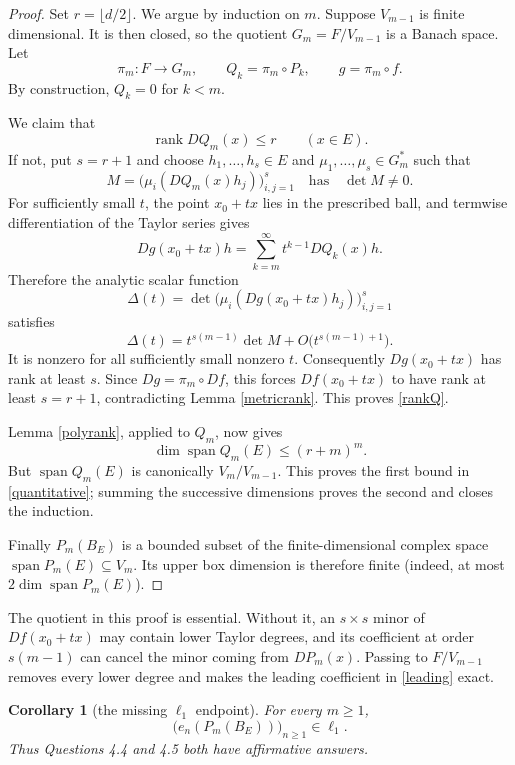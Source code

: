 \documentclass[11pt]{article}
\newtheorem{corollary}[theorem]{Corollary}
\newcommand{\Span}{\operatorname{span}}
\newcommand{\rank}{\operatorname{rank}}
\begin{document}
\begin{proof}
Set $r=\lfloor d/2\rfloor$.  We argue by induction on $m$.  Suppose
$V_{m-1}$ is finite dimensional.  It is then closed, so the quotient
$G_m=F/V_{m-1}$ is a Banach space.  Let
\[
 \pi_m:F\to G_m,
 \qquad Q_k=\pi_m\circ P_k,
 \qquad g=\pi_m\circ f.
\]
By construction, $Q_k=0$ for $k<m$.

We claim that
\begin{equation}\label{rankQ}
 \rank DQ_m(x)\le r\qquad(x\in E).
\end{equation}
If not, put $s=r+1$ and choose $h_1,\ldots,h_s\in E$ and
$\mu_1,\ldots,\mu_s\in G_m^*$ such that
\[
 M=\bigl(\mu_i(DQ_m(x)h_j)\bigr)_{i,j=1}^s
 \quad\text{has}\quad \det M\ne0.
\]
For sufficiently small $t$, the point $x_0+tx$ lies in the prescribed ball,
and termwise differentiation of the Taylor series gives
\[
 Dg(x_0+tx)h
 =\sum_{k=m}^{\infty}t^{k-1}DQ_k(x)h.
\]
Therefore the analytic scalar function
\[
 \Delta(t)=\det\bigl(\mu_i(Dg(x_0+tx)h_j)\bigr)_{i,j=1}^s
\]
satisfies
\begin{equation}\label{leading}
 \Delta(t)=t^{s(m-1)}\det M+O\bigl(t^{s(m-1)+1}\bigr).
\end{equation}
It is nonzero for all sufficiently small nonzero $t$.  Consequently
$Dg(x_0+tx)$ has rank at least $s$.  Since $Dg=\pi_m\circ Df$, this forces
$Df(x_0+tx)$ to have rank at least $s=r+1$, contradicting Lemma
\ref{metricrank}.  This proves \eqref{rankQ}.

Lemma \ref{polyrank}, applied to $Q_m$, now gives
\[
 \dim\Span Q_m(E)\le(r+m)^m.
\]
But $\Span Q_m(E)$ is canonically $V_m/V_{m-1}$.  This proves the first
bound in \eqref{quantitative}; summing the successive dimensions proves the
second and closes the induction.

Finally $P_m(B_E)$ is a bounded subset of the finite-dimensional complex
space $\Span P_m(E)\subseteq V_m$.  Its upper box dimension is therefore
finite (indeed, at most $2\dim\Span P_m(E)$).
\end{proof}

The quotient in this proof is essential.  Without it, an
$s\times s$ minor of $Df(x_0+tx)$ may contain lower Taylor degrees, and its
coefficient at order $s(m-1)$ can cancel the minor coming from $DP_m(x)$.
Passing to $F/V_{m-1}$ removes every lower degree and makes the leading
coefficient in \eqref{leading} exact.

\begin{corollary}[the missing $\ell_1$ endpoint]\label{entropy}
For every $m\ge1$,
\[
 \bigl(e_n(P_m(B_E))\bigr)_{n\ge1}\in\ell_1.
\]
Thus Questions 4.4 and 4.5 both have affirmative answers.
\end{corollary}
\end{document}
